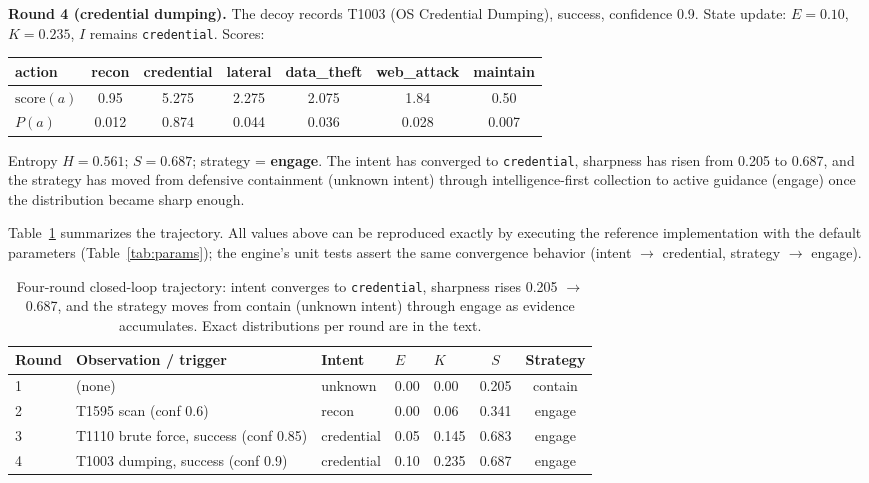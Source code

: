 \documentclass[preprints,article,accept,oneauthor]{Definitions/mdpi}
\newcommand{\act}[1]{\texttt{#1}}
\begin{document}
\textbf{Round 4 (credential dumping).} The decoy records T1003 (OS
Credential Dumping), success, confidence 0.9. State update: $E = 0.10$,
$K = 0.235$, $I$ remains \act{credential}. Scores:
\begin{center}
\begin{adjustbox}{max width=\linewidth}\begin{tabular}{lcccccc}
\toprule
action & recon & credential & lateral & data\_theft & web\_attack & maintain \\
\midrule
$\mathrm{score}(a)$ & 0.95 & 5.275 & 2.275 & 2.075 & 1.84 & 0.50 \\
$P(a)$ & 0.012 & 0.874 & 0.044 & 0.036 & 0.028 & 0.007 \\
\bottomrule
\end{tabular}\end{adjustbox}
\end{center}
Entropy $H = 0.561$; $S = 0.687$; strategy = \textbf{engage}. The intent
has converged to \act{credential}, sharpness has risen from 0.205 to
0.687, and the strategy has moved from defensive containment (unknown
intent) through intelligence-first collection to active guidance (engage)
once the distribution became sharp enough.

Table~\ref{tab:trace} summarizes the trajectory. All values above can be
reproduced exactly by executing the reference implementation with the
default parameters (Table~\ref{tab:params}); the engine's unit tests
assert the same convergence behavior (intent $\to$ credential, strategy
$\to$ engage).

\begin{table}[ht]
\centering
\begin{adjustbox}{max width=\linewidth}\begin{tabular}{@{}lllllcc@{}}
\toprule
\textbf{Round} & \textbf{Observation / trigger} & \textbf{Intent} & $E$ & $K$ & $S$ & \textbf{Strategy} \\
\midrule
1 & (none) & unknown & 0.00 & 0.00 & 0.205 & contain \\
2 & T1595 scan (conf 0.6) & recon & 0.00 & 0.06 & 0.341 & engage \\
3 & T1110 brute force, success (conf 0.85) & credential & 0.05 & 0.145 & 0.683 & engage \\
4 & T1003 dumping, success (conf 0.9) & credential & 0.10 & 0.235 & 0.687 & engage \\
\bottomrule
\end{tabular}\end{adjustbox}
\caption{Four-round closed-loop trajectory: intent converges to
\act{credential}, sharpness rises 0.205 $\to$ 0.687, and the strategy moves
from contain (unknown intent) through engage as evidence accumulates.
Exact distributions per round are in the text.}
\label{tab:trace}
\end{table}
\end{document}
